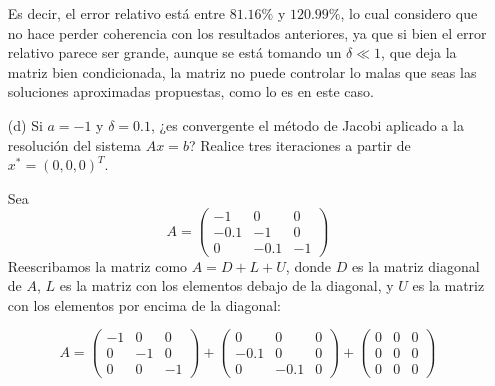 \begin{homeworkProblem}
\begin{enumerate}
\begin{solucion}
Es decir, el error relativo está entre $81.16\%$ y $120.99\%$, lo cual considero que no hace perder coherencia con los resultados anteriores, ya que si bien el error relativo parece ser grande, aunque se está tomando un $\delta \ll 1$, que deja la matriz bien condicionada, la matriz no puede controlar lo malas que seas las soluciones aproximadas propuestas, como lo es en este caso.  
    \end{solucion}
    \item[(d)] Si \( a = -1 \) y \( \delta = 0.1 \), ¿es convergente el método de Jacobi aplicado a la resolución del sistema \( Ax = b \)?  
    Realice tres iteraciones a partir de $x^* =  \left(0, 0,  0\right)^T$.
    \begin{solucion}
      Sea
\[
A = \begin{pmatrix}
            -1 & 0 & 0\\
            -0.1 & -1 & 0\\
            0 & -0.1 & -1
        \end{pmatrix}
\]
Reescribamos la matriz como $ A = D + L + U $, donde $ D $ es la matriz diagonal de $ A $, $ L $ es la matriz con los elementos debajo de la diagonal, y $ U $ es la matriz con los elementos por encima de la diagonal:

\[
A = \begin{pmatrix}
            -1 & 0 & 0\\
            0 & -1 & 0\\
            0 & 0 & -1
        \end{pmatrix}+
        \begin{pmatrix}
            0 & 0 & 0\\
            -0.1 & 0 & 0\\
            0 & -0.1 & 0
        \end{pmatrix}+
        \begin{pmatrix}
            0 & 0 & 0\\
            0 & 0 & 0\\
            0 & 0 & 0
        \end{pmatrix}
\]


\end{solucion}
\end{enumerate}
\end{homeworkProblem}
